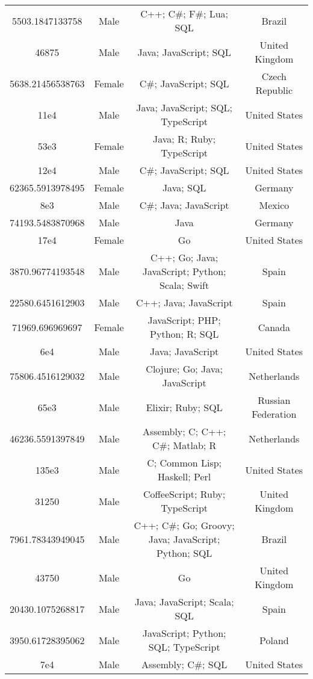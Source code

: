 \begin{center}
\begin{tabular}{ |c|c|c|c| }
5503.1847133758  &  Male  &  C++; C\#; F\#; Lua; SQL  &  Brazil  \\ 
46875  &  Male  &  Java; JavaScript; SQL  &  United Kingdom  \\ 
5638.21456538763  &  Female  &  C\#; JavaScript; SQL  &  Czech Republic  \\ 
11e4  &  Male  &  Java; JavaScript; SQL; TypeScript  &  United States  \\ 
53e3  &  Female  &  Java; R; Ruby; TypeScript  &  United States  \\ 
12e4  &  Male  &  C\#; JavaScript; SQL  &  United States  \\ 
62365.5913978495  &  Female  &  Java; SQL  &  Germany  \\ 
8e3  &  Male  &  C\#; Java; JavaScript  &  Mexico  \\ 
74193.5483870968  &  Male  &  Java  &  Germany  \\ 
17e4  &  Female  &  Go  &  United States  \\ 
3870.96774193548  &  Male  &  C++; Go; Java; JavaScript; Python; Scala; Swift  &  Spain  \\ 
22580.6451612903  &  Male  &  C++; Java; JavaScript  &  Spain  \\ 
71969.696969697  &  Female  &  JavaScript; PHP; Python; R; SQL  &  Canada  \\ 
6e4  &  Male  &  Java; JavaScript  &  United States  \\ 
75806.4516129032  &  Male  &  Clojure; Go; Java; JavaScript  &  Netherlands  \\ 
65e3  &  Male  &  Elixir; Ruby; SQL  &  Russian Federation  \\ 
46236.5591397849  &  Male  &  Assembly; C; C++; C\#; Matlab; R  &  Netherlands  \\ 
135e3  &  Male  &  C; Common Lisp; Haskell; Perl  &  United States  \\ 
31250  &  Male  &  CoffeeScript; Ruby; TypeScript  &  United Kingdom  \\ 
7961.78343949045  &  Male  &  C++; C\#; Go; Groovy; Java; JavaScript; Python; SQL  &  Brazil  \\ 
43750  &  Male  &  Go  &  United Kingdom  \\ 
20430.1075268817  &  Male  &  Java; JavaScript; Scala; SQL  &  Spain  \\ 
3950.61728395062  &  Male  &  JavaScript; Python; SQL; TypeScript  &  Poland  \\ 
7e4  &  Male  &  Assembly; C\#; SQL  &  United States  \\ 

\end{tabular}
\end{center}
